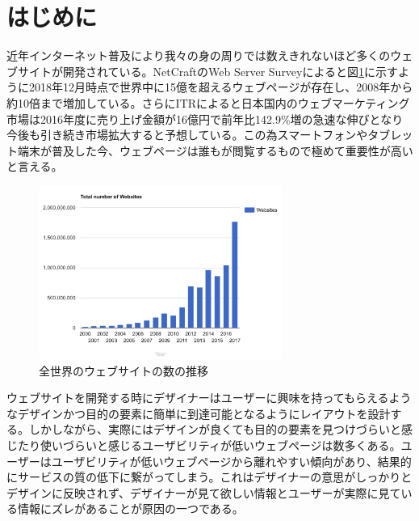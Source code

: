 
\renewcommand{\baselinestretch}{1.5} %
\section{はじめに}\label{sec:introduction}
\renewcommand{\baselinestretch}{1} %


\par 近年インターネット普及により我々の身の周りでは数えきれないほど多くのウェブサイトが開発されている。NetCraftのWeb Server Surveyによると図\ref{fig-num_websites}に示すように2018年12月時点で世界中に15億を超えるウェブページが存在し、2008年から約10倍まで増加している\cite{webserver_survey}。さらにITRによると日本国内のウェブマーケティング市場は2016年度に売り上げ金額が16億円で前年比142.9\%増の急速な伸びとなり今後も引き続き市場拡大すると予想している\cite{itr_webmarket}。この為スマートフォンやタブレット端末が普及した今、ウェブページは誰もが閲覧するもので極めて重要性が高いと言える。

\begin{figure}[H]
    \centering
    \includegraphics[width=8cm]{figures/number-of-websites.png}
    \caption{全世界のウェブサイトの数の推移\cite{internetlivestats}}
    \label{fig-num_websites}
\end{figure}


\par ウェブサイトを開発する時にデザイナーはユーザーに興味を持ってもらえるようなデザインかつ目的の要素に簡単に到達可能となるようにレイアウトを設計する。しかしながら、実際にはデザインが良くても目的の要素を見つけづらいと感じたり使いづらいと感じるユーザビリティが低いウェブページは数多くある。ユーザーはユーザビリティが低いウェブページから離れやすい傾向があり、結果的にサービスの質の低下に繋がってしまう。これはデザイナーの意思がしっかりとデザインに反映されず、デザイナーが見て欲しい情報とユーザーが実際に見ている情報にズレがあることが原因の一つである。

